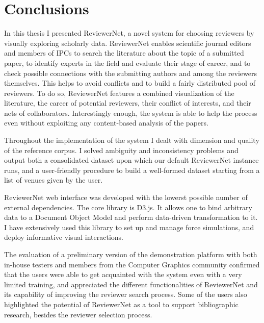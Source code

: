 
\chapter{Conclusions}
\label{sec:conclusions}

In this thesis I presented ReviewerNet, a novel system for choosing reviewers by visually exploring scholarly data. ReviewerNet enables scientific journal editors and members of IPCs to search the literature about the topic of a submitted paper, to identify experts in the field and evaluate their stage of career, and to check possible connections with the submitting authors and among the reviewers themselves. This helps to avoid conflicts and to build a fairly distributed pool of reviewers. To do so, ReviewerNet features a combined visualization of the literature, the career of potential reviewers, their conflict of interests, and their nets of collaborators. Interestingly enough, the system is able to help the process even without exploiting any content-based analysis of the papers.

Throughout the implementation of the system I dealt with dimension and quality of the reference corpus. I solved ambiguity and inconsistency problems and output both a consolidated dataset upon which our default ReviewerNet instance runs, and a user-friendly procedure to build a well-formed dataset starting from a list of venues given by the user. 

ReviewerNet web interface was developed with the lowerst possible number of external dependencies. The core library is D3.js. It allows one to bind arbitrary data to a Document Object Model and perform data-driven transformation to it. I have extensively used this library to set up and manage force simulations, and deploy informative visual interactions. 

The evaluation of a preliminary version of the demonstration platform with both in-house testers and members from the Computer Graphics community confirmed that the users were able to get acquainted with the system even with a very limited training, and  appreciated the different functionalities of ReviewerNet and its capability of improving the reviewer search process.  
Some of the users also highlighted the potential of ReviewerNet as a tool to support bibliographic research, besides the reviewer selection process. 

